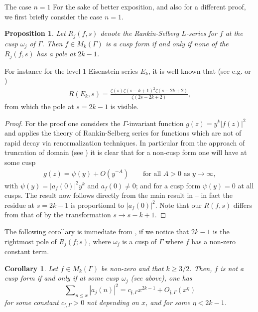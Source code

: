 \documentclass[12pt]{amsart}
\makeatletter
\numberwithin{equation}{section}
\renewcommand\subsubsection{\@secnumfont}{\bfseries}%
\renewcommand\subsubsection{\@startsection{subsubsection}{3}
  \z@{.5\linespacing\@plus.7\linespacing}{-.5em}%
  {\normalfont\bfseries}}
\theoremstyle{plain}
\newtheorem{prop}[thm]{Proposition}
\newtheorem{cor}[thm]{Corollary}
\theoremstyle{definition}
\newcommand{\q}{\quad}
\newcommand{\mk}{\mathfrak}
\newcommand{\sumn}{\sum \nolimits}
\makeatother
\begin{document}
\subsubsection{The case \texorpdfstring{$n=1$}{a}}
For the sake of better exposition, and also for a different proof, we first briefly consider the case $n=1$.

\begin{prop}
Let $R_j(f,s)$ denote the Rankin-Selberg $L$-series for $f$ at the cusp $\omega_j$ of $\Gamma$. Then $f \in M_k(\Gamma)$ is a cusp form if and only if none of the $R_j(f,s)$ has a pole at $2k-1$.
\end{prop}

For instance for the level $1$ Eisenstein series $E_k$, it is well known that (see e.g. \cite[p. 821]{bo-ch} or \cite{zag})
\begin{align}
    R(E_k,s) = \frac{\zeta(s) \zeta(s-k+1)^2 \zeta(s-2k+2)}{\zeta(2s-2k+2)},
\end{align}
from which the pole at $s=2k-1$ is visible.

\begin{proof}
    For the proof one considers the $\Gamma$-invariant function $g(z) = y^{k}|f(z)|^2$ and applies the theory of Rankin-Selberg series for functions which are not of rapid decay via renormalization techniques. In particular from the approach of truncation of domain (see \cite{shamita}) it is clear that for a non-cusp form one will have at some cusp
    \begin{align}
        g(z) = \psi(y) + O(y^{-A}) \q \q \text{for all } A>0 \text{ as } y \to \infty,
    \end{align}
with $\psi(y) = |a_f(0)|^2 y^k$ and $a_f(0) \neq 0$; and for a cusp form $\psi(y)=0$ at all cusps. The result now follows directly from the main result in \cite[p.~117]{shamita} -- in fact the residue at $s=2k-1$ is proportional to $|a_f(0)|^2$. Note that our $R(f,s)$ differs from that of \cite{shamita} by the transformation $s \to s-k+1$.
\end{proof}

The following corollary is immediate from \cite{chandra}, if we notice that $2k-1$ is the rightmost pole of $R_j(  f;s)$, where $\omega_j$ is a cusp of $\Gamma$ where $ f$ has a non-zero constant term. 
\begin{cor}
    Let $ f \in M_k(\Gamma)$ be non-zero and that $k \ge 3/2$. Then, $ f$ is not a cusp form if and only if at some cusp $\omega_j$ (see above), one has
\begin{equation} \label{asymp}
\sumn_{n \leq x} |a_{j}(n)|^2 = c_{\mk f, \Gamma} x^{2k-1} +O_{\mk f, \Gamma}(x^\eta) 
\end{equation}
for some constant $c_{\mk f, \Gamma}>0$ not depending on $x$, and for some  $\eta<2k-1$.
\end{cor}
\end{document}
